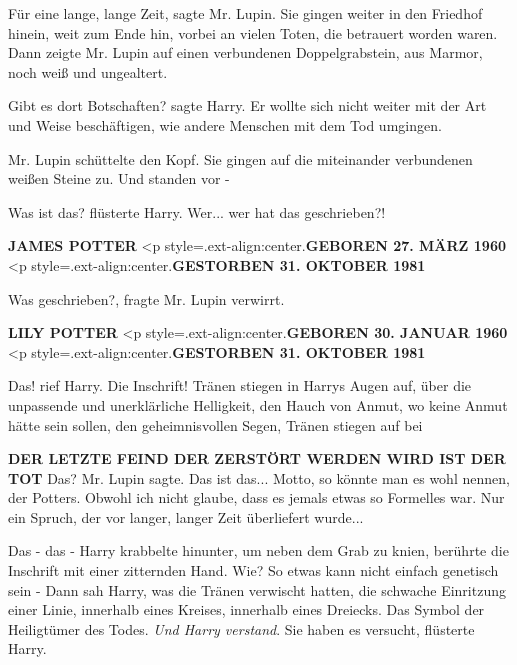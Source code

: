 \glqq{}Für eine lange, lange Zeit\grqq{}, sagte Mr. Lupin. Sie gingen weiter in
den Friedhof hinein, weit zum Ende hin, vorbei an vielen Toten, die betrauert
worden waren. Dann zeigte Mr. Lupin auf einen verbundenen Doppelgrabstein, aus
Marmor, noch weiß und ungealtert.

\glqq{}Gibt es dort Botschaften?\grqq{} sagte Harry. Er wollte sich nicht weiter
mit der Art und Weise beschäftigen, wie andere Menschen mit dem Tod umgingen.

Mr. Lupin schüttelte den Kopf. Sie gingen auf die miteinander verbundenen weißen
Steine zu. Und standen vor -

\glqq{}Was ist das?\grqq{} flüsterte Harry. \glqq{}Wer... wer hat das
geschrieben?!\grqq{}

\textbf{JAMES POTTER}   <p
style=\grqq{}.ext-align:center\grqq{}.\textbf{GEBOREN 27. MÄRZ 1960}   <p
style=\grqq{}.ext-align:center\grqq{}.\textbf{GESTORBEN 31. OKTOBER 1981}

\glqq{}Was geschrieben?\grqq{}, fragte Mr. Lupin verwirrt.

\textbf{LILY POTTER}   <p
style=\grqq{}.ext-align:center\grqq{}.\textbf{GEBOREN 30. JANUAR 1960}   <p
style=\grqq{}.ext-align:center\grqq{}.\textbf{GESTORBEN 31. OKTOBER 1981}

\glqq{}Das!\grqq{} rief Harry. \glqq{}Die Inschrift!\grqq{} Tränen stiegen in
Harrys Augen auf, über die unpassende und unerklärliche Helligkeit, den Hauch
von Anmut, wo keine Anmut hätte sein sollen, den geheimnisvollen Segen, Tränen
stiegen auf bei

\textbf{DER LETZTE FEIND DER ZERSTÖRT
WERDEN WIRD IST DER TOT}     \glqq{}
Das?\grqq{} Mr. Lupin sagte. \glqq{}Das ist das... Motto, so könnte man es wohl
nennen, der Potters. Obwohl ich nicht glaube, dass es jemals etwas so Formelles
war. Nur ein Spruch, der vor langer, langer Zeit überliefert wurde...\grqq{}

\glqq{}Das - das -\grqq{} Harry krabbelte hinunter, um neben dem Grab zu knien,
berührte die Inschrift mit einer zitternden Hand. \glqq{}Wie? So etwas kann nicht
einfach genetisch sein -\grqq{} Dann sah Harry, was die Tränen verwischt hatten,
die schwache Einritzung einer Linie, innerhalb eines Kreises, innerhalb eines
Dreiecks. Das Symbol der Heiligtümer des Todes. \emph{Und Harry verstand}. \glqq{}
Sie haben es versucht\grqq{}, flüsterte Harry.


